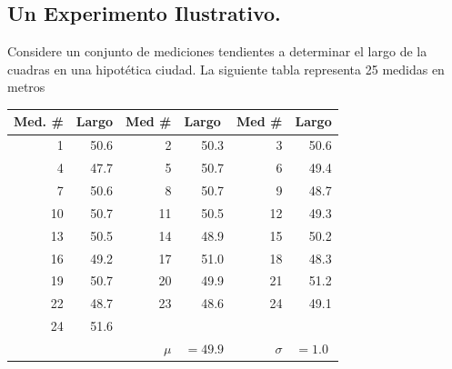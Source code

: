 \documentclass[spanish,titlepage,11pt]{article}
\begin{document}
\subsection{Un Experimento Ilustrativo.}

Considere un conjunto de mediciones tendientes a determinar el largo de la
cuadras en una hipot\'{e}tica ciudad. La siguiente tabla representa 25 medidas
en metros

\begin{center}%
\begin{tabular}
[c]{|llllll|}\hline
Med. \# & \multicolumn{1}{|l}{Largo} & \multicolumn{1}{||l}{Med \#} &
\multicolumn{1}{|l}{Largo} & \multicolumn{1}{||l}{Med \#} &
\multicolumn{1}{|l|}{Largo}\\\hline
\multicolumn{1}{|r}{1} & \multicolumn{1}{|r}{50.6} & \multicolumn{1}{||r}{2} &
\multicolumn{1}{|r}{50.3} & \multicolumn{1}{||r}{3} &
\multicolumn{1}{|r|}{50.6}\\
\multicolumn{1}{|r}{4} & \multicolumn{1}{|r}{47.7} & \multicolumn{1}{||r}{5} &
\multicolumn{1}{|r}{50.7} & \multicolumn{1}{||r}{6} &
\multicolumn{1}{|r|}{49.4}\\
\multicolumn{1}{|r}{7} & \multicolumn{1}{|r}{50.6} & \multicolumn{1}{||r}{8} &
\multicolumn{1}{|r}{50.7} & \multicolumn{1}{||r}{9} &
\multicolumn{1}{|r|}{48.7}\\
\multicolumn{1}{|r}{10} & \multicolumn{1}{|r}{50.7} & \multicolumn{1}{||r}{11}%
& \multicolumn{1}{|r}{50.5} & \multicolumn{1}{||r}{12} &
\multicolumn{1}{|r|}{49.3}\\
\multicolumn{1}{|r}{13} & \multicolumn{1}{|r}{50.5} & \multicolumn{1}{||r}{14}%
& \multicolumn{1}{|r}{48.9} & \multicolumn{1}{||r}{15} &
\multicolumn{1}{|r|}{50.2}\\
\multicolumn{1}{|r}{16} & \multicolumn{1}{|r}{49.2} & \multicolumn{1}{||r}{17}%
& \multicolumn{1}{|r}{51.0} & \multicolumn{1}{||r}{18} &
\multicolumn{1}{|r|}{48.3}\\
\multicolumn{1}{|r}{19} & \multicolumn{1}{|r}{50.7} & \multicolumn{1}{||r}{20}%
& \multicolumn{1}{|r}{49.9} & \multicolumn{1}{||r}{21} &
\multicolumn{1}{|r|}{51.2}\\
\multicolumn{1}{|r}{22} & \multicolumn{1}{|r}{48.7} & \multicolumn{1}{||r}{23}%
& \multicolumn{1}{|r}{48.6} & \multicolumn{1}{||r}{24} &
\multicolumn{1}{|r|}{49.1}\\
\multicolumn{1}{|r}{24} & \multicolumn{1}{|r}{51.6} & \multicolumn{1}{||r}{} &
\multicolumn{1}{|r}{} & \multicolumn{1}{||r}{} & \multicolumn{1}{|r|}{}%
\\\hline
\multicolumn{1}{|r}{} & \multicolumn{1}{r}{} & \multicolumn{1}{r}{$\mu$} &
$=49.9$ & \multicolumn{1}{r}{$\sigma$} & $=1.0$\\\hline
\end{tabular}
\end{center}
\end{document}
